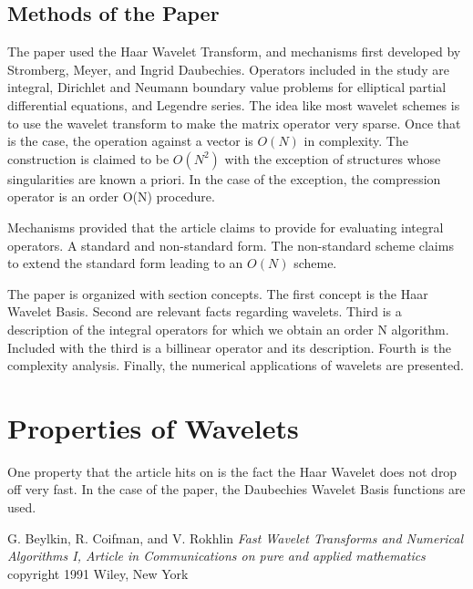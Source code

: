 \documentclass[11pt]{article}
\begin{document}
\subsection { Methods of the Paper}
The paper used the Haar Wavelet Transform, and mechanisms first developed by Stromberg, Meyer, and Ingrid Daubechies.  Operators included in the study are integral, Dirichlet and Neumann boundary value problems for elliptical partial differential equations, and  Legendre series.  The idea like most wavelet schemes is to use the wavelet transform to make the matrix operator very sparse.  Once that is the case, the operation against a vector is $O(N)$ in complexity.      The construction is claimed to be $O(N^2)$ with the exception of structures whose singularities are known a priori.  In the case of the exception, the compression operator is an order O(N) procedure.  

Mechanisms provided that the article claims to provide for evaluating integral operators.  A standard and non-standard form.  The non-standard scheme claims to extend the standard form leading to an $O(N)$ scheme.  

The paper is organized with section concepts.  The first concept is the Haar Wavelet Basis.  Second are relevant facts regarding wavelets.  Third is a description of the integral operators for which we obtain an order N algorithm.  Included with the third is a billinear operator and its description.  Fourth is the complexity analysis.  Finally, the numerical applications of wavelets are presented.  

\section{Properties of Wavelets}
One property that the article hits on is the fact the Haar Wavelet does not drop off very fast.  In the case of the paper, the Daubechies Wavelet Basis functions are used.  

\begin{thebibliography}{99}
 G. Beylkin, R. Coifman, and V. Rokhlin \textsl {Fast Wavelet Transforms and Numerical Algorithms I, Article in Communications on pure and applied mathematics} copyright 1991 Wiley, New York
\end {thebibliography}


 
\end{document}
